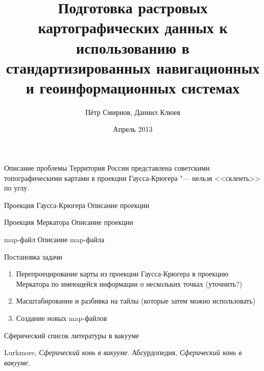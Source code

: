 \documentclass{beamer}
\begin{document}
\title[Подготовка растровых картографических данных]{Подготовка растровых картографических данных к использованию в стандартизированных навигационных и геоинформационных системах}
\author{Пётр Смирнов, Даниил Клюев}
\date{Апрель 2013}

\frame{\titlepage}

\begin{frame}{Описание проблемы}
Территория России представлена советскими топографическими картами в проекции Гаусса-Крюгера "--- нельзя <<склеить>> по углу.
\end{frame}

\begin{frame}{Проекция Гаусса-Крюгера}
Описание проекции
\end{frame}

\begin{frame}{Проекция Меркатора}
Описание проекции
\end{frame}

\begin{frame}{map-файл}
Описание map-файла
\end{frame}

\begin{frame}{Постановка задачи}
\begin{enumerate}
\item Перепроецирование карты из проекции Гаусса-Крюгера в проекцию Меркатора по имеющейся информации о нескольких точках (уточнить?)
\pause
\item Масштабирование и разбивка на тайлы (которые затем можно использовать)
\pause
\item Создание новых map-файлов
\end{enumerate}
\end{frame}

\begin{frame}{Сферический список литературы в вакууме}
 \begin{thebibliography}{10}
\beamertemplatebookbibitems
{}
{\sc Lurkmore}, {\em Сферический конь в вакууме}.
{\sc Абсурдопедия}, {\em Сферический конь в вакууме}.
\end{thebibliography}
\end{frame}
\end{document}
